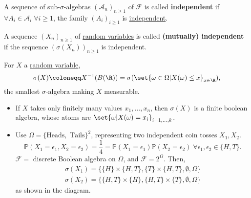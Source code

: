 \documentclass{article}
\newcommand{\1}[1]{\mathbbm{1}_{#1}}
\newcommand{\Prob}{\mathbb{P}}
\begin{document}
\begin{defi}
    A sequence of sub-$\sigma$-algebras $(\mathcal{A}_n)_{n \geq 1}$ of $\mathcal{F}$ is called \textbf{independent} if $\forall A_i \in \mathcal{A}_i \; \forall i \geq 1$, the family $(A_i)_{i \geq 1}$ is \hyperlink{def:independentEvents}{independent}.
\end{defi}

\begin{defi}
    A sequence $(X_n)_{n \geq 1}$ of \hyperlink{def:rv}{random variables} is called \textbf{(mutually) independent} if the sequence $(\sigma(X_n))_{n \geq 1}$ is independent.
\end{defi}

\begin{notation}
    For $X$ a \hyperlink{def:rv}{random variable},
    \begin{equation*}
        \sigma(X) \coloneqq X^{-1}(B(\R)) = \sigma(\set{\omega \in \Omega | X(\omega) \leq x}_{x \in \R}),
    \end{equation*}
    the smallest $\sigma$-algebra making $X$ measurable.
\end{notation}

\begin{eg}
    \leavevmode
    \begin{itemize}
        \item If $X$ takes only finitely many values $x_1, \dotsc, x_n$, then $\sigma(X)$ is a finite boolean algebra, whose atoms are $\set{\omega | X(\omega) = x_i}_{i=1,\dotsc,k}$.
        \item Use $\Omega=\{\text{Heads}, \text{ Tails}\}^2$, representing two independent coin tosses $X_1, X_2$.
            \begin{equation*}
                \Prob(X_1 = \epsilon_1, X_2 = \epsilon_2) = \frac{1}{4} = \Prob(X_1 = \epsilon_1) \Prob(X_2 = \epsilon_2) \; \forall \epsilon_1, \epsilon_2 \in \{H, T\}.
            \end{equation*}
            $\mathcal{F}=$ discrete Boolean algebra on $\Omega$, and $\mathcal{F}=2^\Omega$. Then,
            \begin{align*}
                \sigma(X_1)= \{\{H\} \times \{H, T\}, \{T\} \times \{H, T\}, \emptyset, \Omega\} \\
                \sigma(X_2)= \{\{H, T\} \times \{H\}, \{H, T\} \times \{T\}, \emptyset, \Omega\}
            \end{align*}
            as shown in the diagram.
    \end{itemize}
\end{eg}
\end{document}
